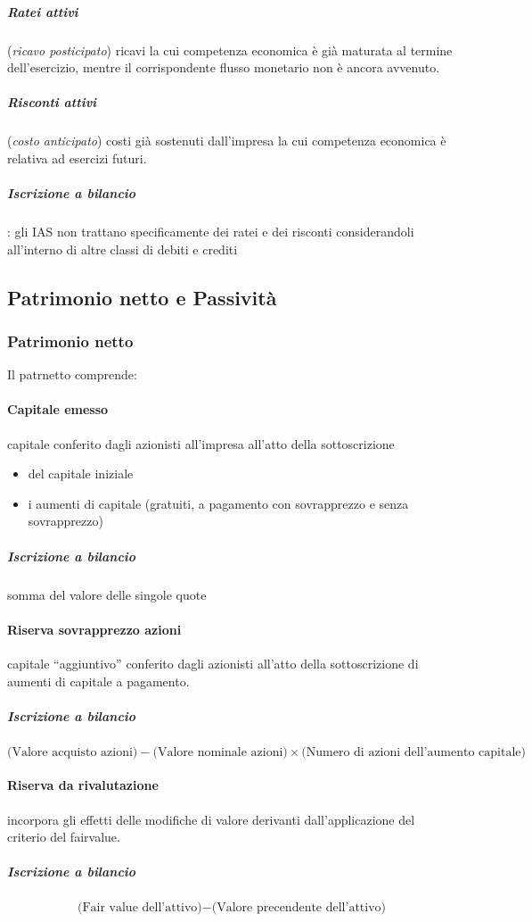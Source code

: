 \subparagraph{Ratei attivi} (\emph{ricavo posticipato}) ricavi la cui competenza economica è già maturata al 
termine dell’esercizio, mentre il corrispondente flusso monetario non è ancora avvenuto.
\subparagraph{Risconti attivi} (\emph{costo anticipato}) costi già sostenuti dall’impresa la cui competenza
economica è relativa ad esercizi futuri.
\subparagraph{Iscrizione a bilancio}: gli IAS non trattano specificamente dei
ratei e dei risconti considerandoli all'interno di altre classi di debiti e crediti

\subsection{Patrimonio netto e Passività}

\subsubsection{Patrimonio netto}
Il \gls{patrnetto} comprende:

\paragraph{Capitale emesso} capitale conferito dagli azionisti all’impresa all’atto della sottoscrizione
\begin{itemize}
    \item del capitale iniziale
    \item i aumenti di capitale (gratuiti, a pagamento con sovrapprezzo e senza sovrapprezzo)
\end{itemize}
\subparagraph{Iscrizione a bilancio} somma del valore delle singole quote

\paragraph{Riserva sovrapprezzo azioni} capitale ``aggiuntivo'' conferito dagli
azionisti all’atto della sottoscrizione di aumenti di capitale a pagamento.
\subparagraph{Iscrizione a bilancio} 
\begin{equation*}
    \text{(Valore acquisto azioni)} - \text{(Valore nominale azioni)}
    \times \text{(Numero di azioni dell'aumento capitale)}
\end{equation*}

\paragraph{Riserva da rivalutazione} incorpora gli effetti delle modifiche di
valore derivanti dall’applicazione del criterio del \gls{fairvalue}.
\subparagraph{Iscrizione a bilancio}
\begin{equation*}
    \text{(Fair value dell'attivo)} - \text{(Valore precendente dell'attivo)}
\end{equation*}

